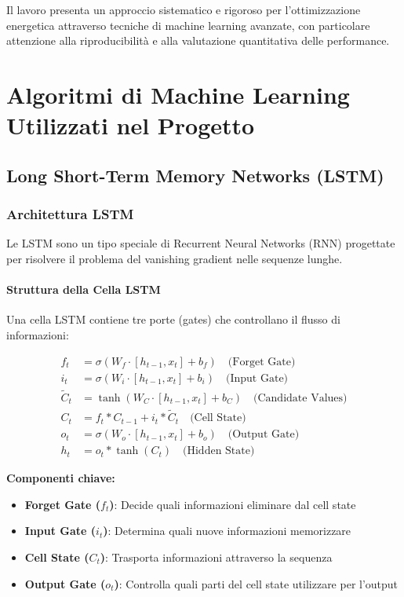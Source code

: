 \documentclass[12pt,a4paper,twoside]{report}
\begin{document}
Il lavoro presenta un approccio sistematico e rigoroso per l'ottimizzazione energetica attraverso tecniche di machine learning avanzate, con particolare attenzione alla riproducibilità e alla valutazione quantitativa delle performance.


\chapter{Algoritmi di Machine Learning Utilizzati nel Progetto}

\section{Long Short-Term Memory Networks (LSTM)}

\subsection{Architettura LSTM}

Le LSTM sono un tipo speciale di Recurrent Neural Networks (RNN) progettate per risolvere il problema del vanishing gradient nelle sequenze lunghe.

\subsubsection{Struttura della Cella LSTM}

Una cella LSTM contiene tre porte (gates) che controllano il flusso di informazioni:

\begin{align}
f_t &= \sigma(W_f \cdot [h_{t-1}, x_t] + b_f) \quad \text{(Forget Gate)} \\
i_t &= \sigma(W_i \cdot [h_{t-1}, x_t] + b_i) \quad \text{(Input Gate)} \\
\tilde{C}_t &= \tanh(W_C \cdot [h_{t-1}, x_t] + b_C) \quad \text{(Candidate Values)} \\
C_t &= f_t * C_{t-1} + i_t * \tilde{C}_t \quad \text{(Cell State)} \\
o_t &= \sigma(W_o \cdot [h_{t-1}, x_t] + b_o) \quad \text{(Output Gate)} \\
h_t &= o_t * \tanh(C_t) \quad \text{(Hidden State)}
\end{align}

\textbf{Componenti chiave:}
\begin{itemize}
    \item \textbf{Forget Gate ($f_t$)}: Decide quali informazioni eliminare dal cell state
    \item \textbf{Input Gate ($i_t$)}: Determina quali nuove informazioni memorizzare
    \item \textbf{Cell State ($C_t$)}: Trasporta informazioni attraverso la sequenza
    \item \textbf{Output Gate ($o_t$)}: Controlla quali parti del cell state utilizzare per l'output
\end{itemize}
\end{document}
